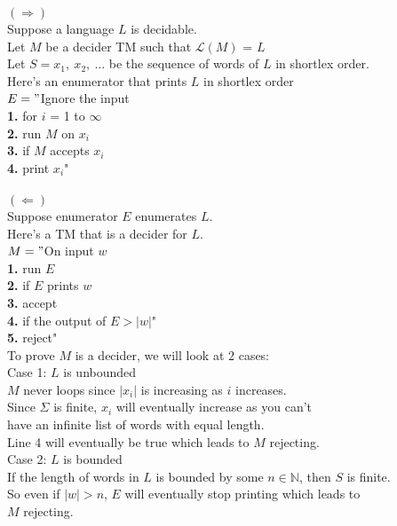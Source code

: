 \documentclass[preview]{standalone} %
\begin{document}
$(\Longrightarrow)$\\
Suppose a language $L$ is decidable. \\
Let $M$ be a decider TM such that $\mathcal{L}(M)$ = $L$\\
Let $S = x_1,\ x_2,\ \dots$ be the sequence of words of $L$ in shortlex order.\\

Here's an enumerator that prints $L$ in shortlex order\\
$E="$Ignore the input\\
\hspace*{8mm} \textbf{1.} for $i$ = 1 to $\infty$\\
\hspace*{8mm} \textbf{2.} \qquad run $M$ on $x_i$\\
\hspace*{8mm} \textbf{3.} \qquad if $M$ accepts $x_i$\\
\hspace*{8mm} \textbf{4.} \qquad \qquad print $x_i$"\\\\

$(\Longleftarrow)$\\
Suppose enumerator $E$ enumerates $L$. \\

Here's a TM that is a decider for $L$.\\
$M="$On input $w$\\
\hspace*{8mm} \textbf{1.} run $E$\\
\hspace*{8mm} \textbf{2.} if $E$ prints $w$\\
\hspace*{8mm} \textbf{3.} \qquad accept\\
\hspace*{8mm} \textbf{4.} if the output of $E > |w|$"\\
\hspace*{8mm} \textbf{5.} \qquad reject"\\

To prove $M$ is a decider, we will look at 2 cases:\\
Case 1: $L$ is unbounded\\
\hspace*{8mm} $M$ never loops since $|x_i|$ is increasing as $i$ increases.\\
\hspace*{8mm} Since $\Sigma$ is finite, $x_i$ will eventually increase as you can't\\
\hspace*{8mm} have an infinite list of words with equal length.\\
\hspace*{8mm} Line 4 will eventually be true which leads to $M$ rejecting.\\

Case 2: $L$ is bounded\\
\hspace*{8mm} If the length of words in $L$ is bounded by some $n \in \mathbb{N}$, then $S$ is finite.\\
\hspace*{8mm} So even if $|w| > n$, $E$ will eventually stop printing which leads to\\
\hspace*{8mm} $M$ rejecting.
\end{document}
